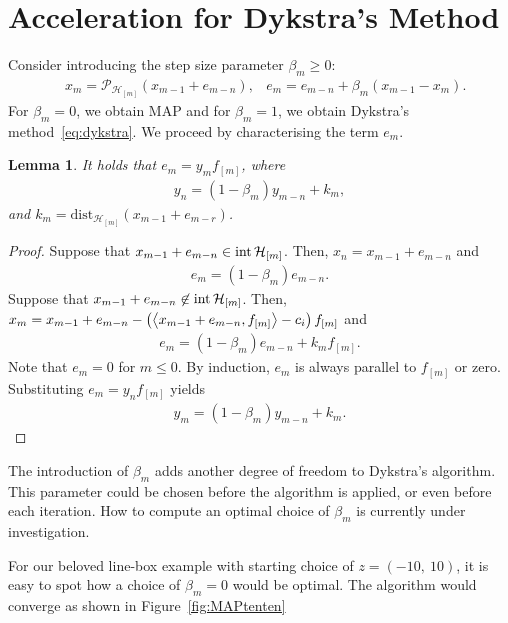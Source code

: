 \documentclass[hidelinks]{article}
\newtheorem{lemma}{Lemma}
\begin{document}
\section{Acceleration for Dykstra's Method}
%
Consider introducing the step size parameter $\beta_m\geq 0$:
\begin{align}\label{eq:dykstramodif}
&x_m=\mathcal{P}_{\mathcal{H}_{[m]}}\left(x_{m-1}+e_{m-n}\right),
&e_m=e_{m-n}+\beta_m(x_{m-1}-x_m).
\end{align}
For $\beta_m=0$, we obtain MAP and for $\beta_m=1$, we obtain Dykstra's method~\eqref{eq:dykstra}. We proceed by characterising the term $e_m$.
\begin{lemma}
It holds that $e_m=y_m f_{[m]}$, where
\begin{align*}
y_n = (1-\beta_m)y_{m-n} +k_m,
\end{align*}
and $k_m=\text{dist}_{\mathcal{H}_{[m]}}(x_{m-1}+e_{m-r})$.
\end{lemma}
\begin{proof}
Suppose that $x_{m-1}+e_{m-n}\in\operatorname*{int}\mathcal{H}_{[m]}$. Then, $x_n=x_{m-1}+e_{m-n}$ and
\begin{align*}
e_m=(1-\beta_m)e_{m-n}.
\end{align*}
Suppose that $x_{m-1}+e_{m-n}\not\in\operatorname*{int}\mathcal{H}_{[m]}$. Then, $x_m=x_{m-1}+e_{m-n}-\left(\left\langle x_{m-1}+e_{m-n} , f_{[m]} \right\rangle - c_i\right)f_{[m]}$ and
\begin{align*}
e_m=(1-\beta_m)e_{m-n}+k_mf_{[m]}.
\end{align*}
Note that $e_m=0$ for $m\leq 0$. By induction, $e_m$ is always parallel to $f_{[m]}$ or zero. Substituting $e_m=y_nf_{[m]}$ yields
\begin{align*}
y_m=(1-\beta_m)y_{m-n}+k_m.
\end{align*} 
\end{proof}
%
The introduction of $\beta_m$ adds another degree of freedom to Dykstra's algorithm. This parameter could be chosen before the algorithm is applied, or even before each iteration. How to compute an optimal choice of $\beta_m$ is currently under investigation.
%
\newpage
\par For our beloved line-box example with starting choice of $z = (-10,~10)$, it is easy to spot how a choice of $\beta_m = 0$ would be optimal. The algorithm would converge as shown in Figure~\ref{fig:MAPtenten}
%
\end{document}
